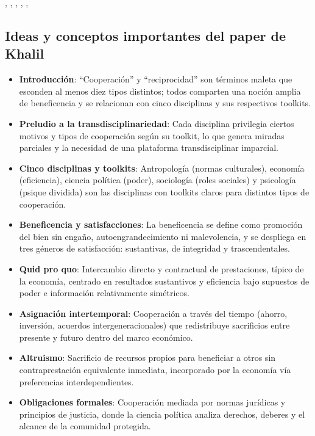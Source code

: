 \documentclass[a4paper,11pt]{article}
\begin{document}
\cite{axelrod_1984}, \cite{axelrod.dilon_2004}, \cite{ball_2008}, \cite{strogatz_2019}, \cite{khalil_2025a}, \cite{skocpol_1994}

\newpage
\begin{seccionbox}[verdesuave]{\subsection*{Ideas y conceptos importantes del paper de Khalil}}
    \begin{itemize}
        \item \textbf{Introducción}: “Cooperación” y “reciprocidad” son términos maleta que esconden al menos diez tipos distintos; todos comparten una noción amplia de beneficencia y se relacionan con cinco disciplinas y sus respectivos toolkits.
        \item \textbf{Preludio a la transdisciplinariedad}: Cada disciplina privilegia ciertos motivos y tipos de cooperación según su toolkit, lo que genera miradas parciales y la necesidad de una plataforma transdisciplinar imparcial.
        \item \textbf{Cinco disciplinas y toolkits}: Antropología (normas culturales), economía (eficiencia), ciencia política (poder), sociología (roles sociales) y psicología (psique dividida) son las disciplinas con toolkits claros para distintos tipos de cooperación.
        \item \textbf{Beneficencia y satisfacciones}: La beneficencia se define como promoción del bien sin engaño, autoengrandecimiento ni malevolencia, y se despliega en tres géneros de satisfacción: sustantivas, de integridad y trascendentales.
        \item \textbf{Quid pro quo}: Intercambio directo y contractual de prestaciones, típico de la economía, centrado en resultados sustantivos y eficiencia bajo supuestos de poder e información relativamente simétricos.
        \item \textbf{Asignación intertemporal}: Cooperación a través del tiempo (ahorro, inversión, acuerdos intergeneracionales) que redistribuye sacrificios entre presente y futuro dentro del marco económico.
        \item \textbf{Altruismo}: Sacrificio de recursos propios para beneficiar a otros sin contraprestación equivalente inmediata, incorporado por la economía vía preferencias interdependientes.
        \item \textbf{Obligaciones formales}: Cooperación mediada por normas jurídicas y principios de justicia, donde la ciencia política analiza derechos, deberes y el alcance de la comunidad protegida.

\end{itemize}
\end{seccionbox}
\end{document}
